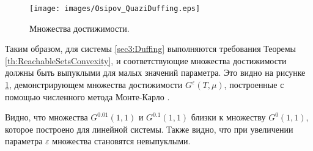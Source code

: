 \documentclass[../main.tex]{subfiles}
\begin{document}
    \begin{figure}[t]
        \centerline{
            \texttt{[image: images/Osipov\_QuaziDuffing.eps]}}
        \caption{Множества достижимости.}
        \label{fig:Duffing}
    \end{figure}
    
    Таким образом, для системы \eqref{sec3:Duffing} выполняются требования Теоремы \ref{th:ReachableSetsConvexity}, и соответствующие множества достижимости должны быть выпуклыми для малых значений параметра. 
    Это видно на рисунке \ref{fig:Duffing}, демонстрирующем множества достижимости $G^{\varepsilon}(T,\mu)$, построенные с помощью численного метода Монте-Карло \cite{Patent,Zykov}.
    
    Видно, что множества $G^{0.01}(1,1) $ и $G^{0.1}(1,1) $ близки к множеству $G^{0}(1,1) $, которое построено для линейной системы. 
    Также видно, что при увеличении параметра $\varepsilon$ множества становятся невыпуклыми. 
    
\end{document}

